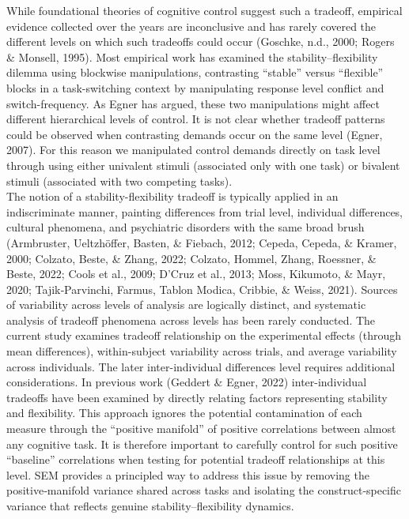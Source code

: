 \documentclass[
  english,
  man,floatsintext]{apa6}
\begin{document}
While foundational theories of cognitive control suggest such a tradeoff, empirical evidence collected over the years are inconclusive and has rarely covered the different levels on which such tradeoffs could occur (Goschke, n.d., 2000; Rogers \& Monsell, 1995). Most empirical work has examined the stability--flexibility dilemma using blockwise manipulations, contrasting ``stable'' versus ``flexible'' blocks in a task-switching context by manipulating response level conflict and switch-frequency.
As Egner has argued, these two manipulations might affect different hierarchical levels of control. It is not clear whether tradeoff patterns could be observed when contrasting demands occur on the same level (Egner, 2007). For this reason we manipulated control demands directly on task level through using either univalent stimuli (associated only with one task) or bivalent stimuli (associated with two competing tasks).\\
The notion of a stability-flexibility tradeoff is typically applied in an indiscriminate manner, painting differences from trial level, individual differences, cultural phenomena, and psychiatric disorders with the same broad brush (Armbruster, Ueltzhöffer, Basten, \& Fiebach, 2012; Cepeda, Cepeda, \& Kramer, 2000; Colzato, Beste, \& Zhang, 2022; Colzato, Hommel, Zhang, Roessner, \& Beste, 2022; Cools et al., 2009; D'Cruz et al., 2013; Moss, Kikumoto, \& Mayr, 2020; Tajik‐Parvinchi, Farmus, Tablon Modica, Cribbie, \& Weiss, 2021). Sources of variability across levels of analysis are logically distinct, and systematic analysis of tradeoff phenomena across levels has been rarely conducted. The current study examines tradeoff relationship on the experimental effects (through mean differences), within-subject variability across trials, and average variability across individuals.
The later inter-individual differences level requires additional considerations. In previous work (Geddert \& Egner, 2022) inter-individual tradeoffs have been examined by directly relating factors representing stability and flexibility. This approach ignores the potential contamination of each measure through the ``positive manifold'' of positive correlations between almost any cognitive task. It is therefore important to carefully control for such positive ``baseline'' correlations when testing for potential tradeoff relationships at this level. SEM provides a principled way to address this issue by removing the positive‑manifold variance shared across tasks and isolating the construct‑specific variance that reflects genuine stability--flexibility dynamics.
\end{document}
